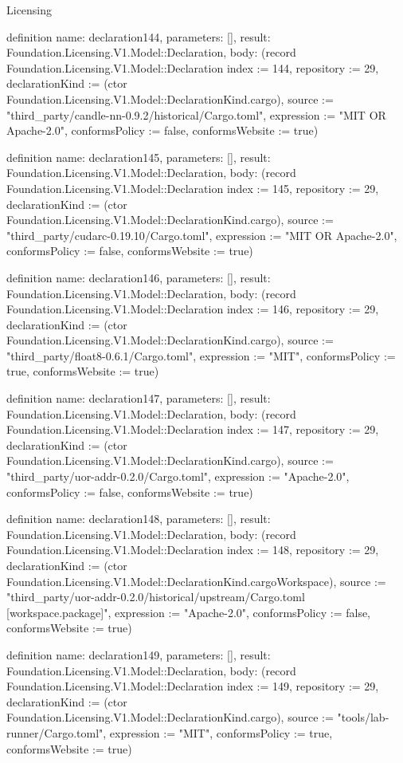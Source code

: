 \begin{lexlean}{Licensing}
\begin{semanticmodule}
definition{
  name: declaration144,
  parameters: [],
  result: Foundation.Licensing.V1.Model::Declaration,
  body: (record Foundation.Licensing.V1.Model::Declaration {index := 144, repository := 29, declarationKind := (ctor Foundation.Licensing.V1.Model::DeclarationKind.cargo), source := "third_party/candle-nn-0.9.2/historical/Cargo.toml", expression := "MIT OR Apache-2.0", conformsPolicy := false, conformsWebsite := true})
}

definition{
  name: declaration145,
  parameters: [],
  result: Foundation.Licensing.V1.Model::Declaration,
  body: (record Foundation.Licensing.V1.Model::Declaration {index := 145, repository := 29, declarationKind := (ctor Foundation.Licensing.V1.Model::DeclarationKind.cargo), source := "third_party/cudarc-0.19.10/Cargo.toml", expression := "MIT OR Apache-2.0", conformsPolicy := false, conformsWebsite := true})
}

definition{
  name: declaration146,
  parameters: [],
  result: Foundation.Licensing.V1.Model::Declaration,
  body: (record Foundation.Licensing.V1.Model::Declaration {index := 146, repository := 29, declarationKind := (ctor Foundation.Licensing.V1.Model::DeclarationKind.cargo), source := "third_party/float8-0.6.1/Cargo.toml", expression := "MIT", conformsPolicy := true, conformsWebsite := true})
}

definition{
  name: declaration147,
  parameters: [],
  result: Foundation.Licensing.V1.Model::Declaration,
  body: (record Foundation.Licensing.V1.Model::Declaration {index := 147, repository := 29, declarationKind := (ctor Foundation.Licensing.V1.Model::DeclarationKind.cargo), source := "third_party/uor-addr-0.2.0/Cargo.toml", expression := "Apache-2.0", conformsPolicy := false, conformsWebsite := true})
}

definition{
  name: declaration148,
  parameters: [],
  result: Foundation.Licensing.V1.Model::Declaration,
  body: (record Foundation.Licensing.V1.Model::Declaration {index := 148, repository := 29, declarationKind := (ctor Foundation.Licensing.V1.Model::DeclarationKind.cargoWorkspace), source := "third_party/uor-addr-0.2.0/historical/upstream/Cargo.toml [workspace.package]", expression := "Apache-2.0", conformsPolicy := false, conformsWebsite := true})
}

definition{
  name: declaration149,
  parameters: [],
  result: Foundation.Licensing.V1.Model::Declaration,
  body: (record Foundation.Licensing.V1.Model::Declaration {index := 149, repository := 29, declarationKind := (ctor Foundation.Licensing.V1.Model::DeclarationKind.cargo), source := "tools/lab-runner/Cargo.toml", expression := "MIT", conformsPolicy := true, conformsWebsite := true})
}


\end{semanticmodule}
\end{lexlean}
